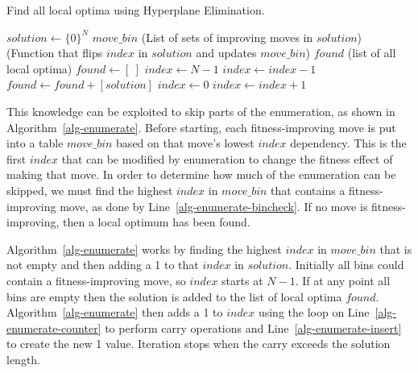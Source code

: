 \documentclass[runningheads,a4paper]{llncs}
\begin{document}
\begin{algorithm}
  \caption{Find all local optima using Hyperplane Elimination.}
  \label{alg-enumerate}
  \begin{algorithmic}[1]
    \Require $solution \leftarrow \{0\}^N$
    \Require $move\_bin$ (List of sets of improving moves in $solution$)
    \Require {} (Function that flips $index$ in $solution$ and updates $move\_bin$)
    \Ensure $found$ (list of all local optima)
    \State $found \leftarrow [~]$
    \State $index \leftarrow N-1$
      \label{alg-enumerate-bincheck}
        \State $index \leftarrow index-1$
      \EndWhile
        \State $found \leftarrow found + [solution]$
        \State $index \leftarrow 0$
      \EndIf
      \label{alg-enumerate-counter}
        \State {}
        \State $index \leftarrow index + 1$
      \EndWhile
        \State {}\label{alg-enumerate-insert}
      \EndIf
    \EndWhile
  \end{algorithmic}
\end{algorithm}

This knowledge can be exploited to skip parts of the enumeration,
as shown in Algorithm~\ref{alg-enumerate}.
Before starting, each fitness-improving move is put into a table $move\_bin$
based on that move's lowest $index$ dependency. This is the first $index$ that
can be modified by enumeration to change the fitness effect of making that move.
In order to determine how much of the enumeration can be skipped, we must find
the highest $index$ in $move\_bin$ that contains a fitness-improving move,
as done by Line~\ref{alg-enumerate-bincheck}. If no move is fitness-improving,
then a local optimum has been found.

Algorithm~\ref{alg-enumerate} works by finding the highest $index$ in $move\_bin$
that is not empty and then adding a 1 to that $index$ in $solution$. Initially
all bins could contain a fitness-improving move, so $index$ starts at $N-1$.
If at any point all bins are empty then the solution is added to the list of
local optima $found$. Algorithm~\ref{alg-enumerate} then
adds a 1 to $index$ using the loop on Line~\ref{alg-enumerate-counter}
to perform carry operations and Line~\ref{alg-enumerate-insert} to create the new 1 value.
Iteration stops when the carry exceeds the solution length.
\end{document}
